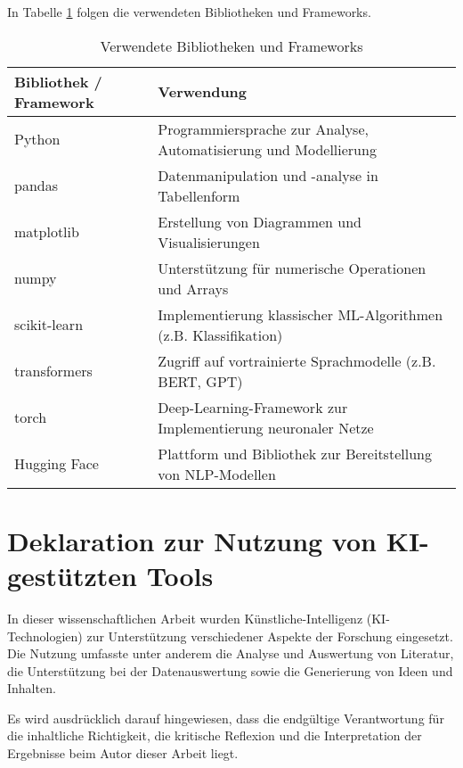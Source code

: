 In Tabelle \ref{tab:libs} folgen die verwendeten Bibliotheken und Frameworks.

\begin{table}[!ht]
    \renewcommand{\arraystretch}{1.3}
    \begin{tabular}{|p{3cm}|p{10.5cm}|}
        \hline 
        \rowcolor{lightgray} \textbf{Bibliothek / Framework} & \textbf{Verwendung} \\
        \hline
        Python & Programmiersprache zur Analyse, Automatisierung und Modellierung \\
        \hline
        pandas & Datenmanipulation und -analyse in Tabellenform \\
        \hline
        matplotlib & Erstellung von Diagrammen und Visualisierungen \\
        \hline
        numpy & Unterstützung für numerische Operationen und Arrays \\
        \hline
        scikit-learn & Implementierung klassischer ML-Algorithmen (z.B. Klassifikation) \\
        \hline
        transformers & Zugriff auf vortrainierte Sprachmodelle (z.B. BERT, GPT) \\
        \hline
        torch & Deep-Learning-Framework zur Implementierung neuronaler Netze \\
        \hline
        Hugging Face & Plattform und Bibliothek zur Bereitstellung von NLP-Modellen \\
        \hline
    \end{tabular}
    \caption{Verwendete Bibliotheken und Frameworks}
    \label{tab:libs}
\end{table}

\newpage

\section{Deklaration zur Nutzung von KI-gestützten Tools}

In dieser wissenschaftlichen Arbeit wurden Künstliche-Intelligenz (KI-Technologien) zur Unterstützung verschiedener Aspekte der Forschung eingesetzt. 
Die Nutzung umfasste unter anderem die Analyse und Auswertung von Literatur, die Unterstützung bei der Datenauswertung sowie die Generierung von Ideen und Inhalten.

Es wird ausdrücklich darauf hingewiesen, dass die endgültige Verantwortung für die inhaltliche Richtigkeit, die kritische Reflexion und die Interpretation der 
Ergebnisse beim Autor dieser Arbeit liegt.

